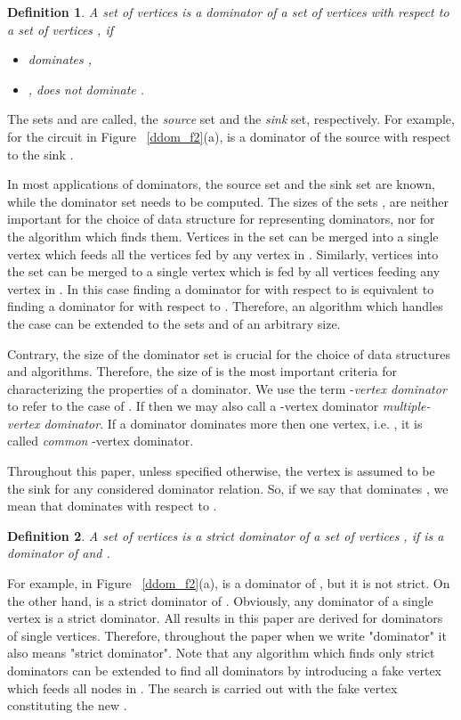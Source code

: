 \documentclass{llncs}
\newtheorem{defn}{Definition}
\begin{document}
\begin{defn} \label{ddom_dom2}
A set of vertices  is a {\em dominator} of a set of vertices
 with respect to a set of vertices , if
\begin{itemize}
\item[(a)]  dominates ,
\item[(b)] ,  does not dominate .
\end{itemize}
\end{defn}

The sets  and  are called, the {\em source} set and the {\em sink} set, respectively.
For example, for the circuit in Figure~ \ref{ddom_f2}(a),  is a dominator of the source 
with respect to the sink .

In most applications of dominators, the source set  and the
sink set  are known, while the dominator set  needs to
be computed. The sizes of the sets ,
 are neither important for the choice of data structure for representing dominators,
nor for the algorithm which finds them. Vertices in the set 
can be merged into a single vertex  which feeds all the vertices fed by any vertex in . Similarly, vertices into the set 
can be merged to a single vertex  which is fed by all vertices feeding any vertex in . In this case finding a dominator for  with respect to  is equivalent to finding a dominator for  with respect to . Therefore, an algorithm which
handles the case  can be extended to the sets  and  of an arbitrary size.

Contrary, the size of the dominator set  is crucial for the choice
of data structures and algorithms.  
Therefore, the size of 
is the most important criteria for characterizing the properties of a
dominator. 
We use the term -{\em vertex dominator} to refer to
the case of . If  then we may also call a -vertex dominator {\em multiple-vertex dominator}.
If a dominator dominates more then one vertex, i.e. , it is called
{\em common} -vertex dominator.

Throughout this paper, unless specified otherwise, the vertex 
is assumed to be the sink for any considered dominator relation.
So, if we say that  dominates , we mean that  dominates
 with respect to .

\begin{defn} \label{ddom_sdom}
A set of vertices  is a {\em strict} dominator of a set of vertices ,
if  is a dominator of  and .
\end{defn}

For example, in Figure~ \ref{ddom_f2}(a),  is a dominator of ,
but it is not strict. On the other hand,  is a strict dominator of . Obviously, any
dominator of a single vertex is a strict dominator. All results in this paper are derived for 
dominators of single vertices. Therefore, throughout the paper when we write "dominator" it also means "strict dominator".
Note that 
any algorithm which finds only strict dominators can be 
extended to find all dominators by introducing a
fake vertex which feeds all nodes in . The search is
carried out with the fake vertex constituting the new .
\end{document}
